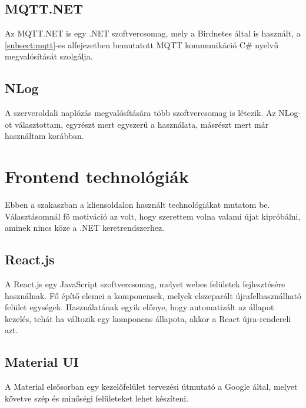 \subsection{MQTT.NET}
Az MQTT.NET is egy .NET szoftvercsomag, mely a Birdnetes által is használt, a \ref{subsect:mqtt}-es alfejezetben bemutatott MQTT kommunikáció C\# nyelvű megvalósítását szolgálja.

\subsection{NLog}
A szerveroldali naplózás megvalósítására több szoftvercsomag is létezik. Az NLog\cite{nlog}-ot választottam, egyrészt mert egyszerű a használata,
másrészt mert már használtam korábban.

\section{Frontend technológiák}
Ebben a szakaszban a kliensoldalon használt technológiákat mutatom be. 
Választásomnál fő motiváció az volt, hogy szerettem volna valami újat kipróbálni, aminek nincs köze a .NET keretrendszerhez.

\subsection{React.js}
A React.js\cite{react} egy JavaScript szoftvercsomag, melyet webes felületek fejlesztésére használnak.
Fő építő elemei a komponensek, melyek elszeparált újrafelhasználható felület egységek.
Használatának egyik előnye, hogy automatizált az állapot kezelés, tehát ha változik egy komponens állapota, akkor a React újra-rendereli azt.

\subsection{Material UI}
A Material\cite{material} elsősorban egy kezelőfelület tervezési útmutató a Google által, melyet követve szép és minőségi felületeket lehet készíteni.

